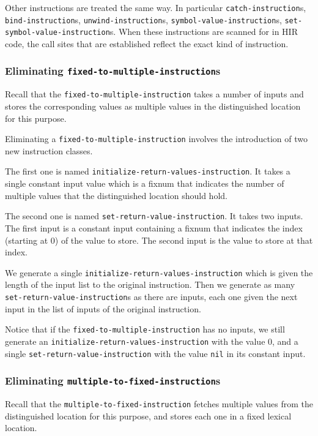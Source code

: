 Other instructions are treated the same way.  In particular
\texttt{catch-instruction}s, \texttt{bind-instruction}s,
\texttt{unwind-instruction}s, \texttt{symbol-value-instruction}s,
\texttt{set-symbol-value-instruction}s.  When these instructions are
scanned for in HIR code, the call sites that are established reflect
the exact kind of instruction.

\subsubsection{Eliminating \texttt{fixed-to-multiple-instruction}s}

Recall that the \texttt{fixed-to-multiple-instruction} takes a
number of inputs and stores the corresponding values as multiple
values in the distinguished location for this purpose.

Eliminating a \texttt{fixed-to-multiple-instruction} involves the
introduction of two new instruction classes.

The first one is named \texttt{initialize-return-values-instruction}.
It takes a single constant input value which is a fixnum that
indicates the number of multiple values that the distinguished
location should hold.

The second one is named \texttt{set-return-value-instruction}.  It
takes two inputs.  The first input is a constant input containing a
fixnum that indicates the index (starting at 0) of the value to
store.  The second input is the value to store at that index.

We generate a single \texttt{initialize-return-values-instruction}
which is given the length of the input list to the original
instruction.  Then we generate as many
\texttt{set-return-value-instruction}s as there are inputs, each one
given the next input in the list of inputs of the original
instruction.

Notice that if the \texttt{fixed-to-multiple-instruction} has no
inputs, we still generate an
\texttt{initialize-return-values-instruction} with the value 0, and a
single \texttt{set-return-value-instruction} with the value
\texttt{nil} in its constant input.

\subsubsection{Eliminating \texttt{multiple-to-fixed-instruction}s}

Recall that the \texttt{multiple-to-fixed-instruction} fetches
multiple values from the distinguished location for this purpose, and
stores each one in a fixed lexical location.

